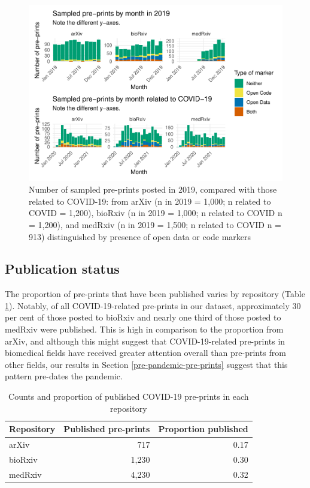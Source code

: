 \documentclass[
]{article}
\begin{document}
\begin{figure}

{\centering \includegraphics[width=0.9\linewidth]{paper_files/figure-latex/arxiv-and-monthly-papers-condition-stack-1} 

}

\caption{Number of sampled pre-prints posted in 2019, compared with those related to COVID-19: from arXiv (n in 2019 = 1,000; n related to COVID = 1,200), bioRxiv (n in 2019 = 1,000; n related to COVID n = 1,200), and medRxiv (n in 2019 = 1,500; n related to COVID n = 913) distinguished by presence of open data or code markers}\label{fig:arxiv-and-monthly-papers-condition-stack}
\end{figure}

\hypertarget{publication-status}{%
\subsection{Publication status}\label{publication-status}}

The proportion of pre-prints that have been published varies by repository (Table \ref{tab:published-sample-summary}). Notably, of all COVID-19-related pre-prints in our dataset, approximately 30 per cent of those posted to bioRxiv and nearly one third of those posted to medRxiv were published. This is high in comparison to the proportion from arXiv, and although this might suggest that COVID-19-related pre-prints in biomedical fields have received greater attention overall than pre-prints from other fields, our results in Section \ref{pre-pandemic-pre-prints} suggest that this pattern pre-dates the pandemic.

\begin{table}

\caption{\label{tab:published-sample-summary}Counts and proportion of published COVID-19 pre-prints in each repository}
\centering
\begin{tabular}[t]{l|r|r}
\hline
Repository & Published pre-prints & Proportion published\\
\hline
arXiv & 717 & 0.17\\
\hline
bioRxiv & 1,230 & 0.30\\
\hline
medRxiv & 4,230 & 0.32\\
\hline
\end{tabular}
\end{table}
\end{document}
